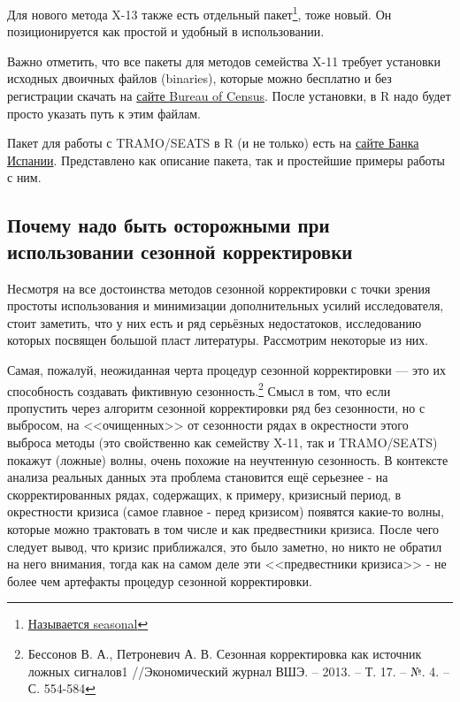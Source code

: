\documentclass[final,pdftex]{../../template/epsilonj}\usepackage[]{graphicx}\usepackage[]{color}
\begin{document}
Для нового метода X-13 также есть отдельный пакет\footnote{\href{http://cran.r-project.org/web/packages/seasonal/seasonal.pdf}{Называется seasonal}}, тоже новый. Он позиционируется как простой и удобный в использовании. 

Важно отметить, что все пакеты для методов семейства X-11 требует установки исходных двоичных файлов (binaries), которые можно бесплатно и без регистрации скачать на \href{http://www.census.gov/srd/www/x12a/}{сайте Bureau of Census}. После установки, в R надо будет просто указать путь к этим файлам. 

Пакет для работы с TRAMO/SEATS в R (и не только) есть на \href{http://www.bde.es/bde/en/secciones/servicios/Profesionales/Programas_estadi/Interfaces.html}{сайте Банка Испании}. Представлено как описание пакета, так и простейшие примеры работы с ним. 

\subsection{Почему надо быть осторожными при использовании сезонной корректировки}

Несмотря на все достоинства методов сезонной корректировки с точки зрения простоты использования и минимизации дополнительных усилий исследователя, стоит заметить, что у них есть и ряд серьёзных недостатоков, исследованию которых посвящен большой пласт литературы. Рассмотрим некоторые из них. 

Самая, пожалуй, неожиданная черта процедур сезонной корректировки --- это их способность создавать фиктивную сезонность.\footnote{Бессонов В. А., Петроневич А. В. Сезонная корректировка как источник ложных сигналов1 //Экономический журнал ВШЭ. – 2013. – Т. 17. – №. 4. – С. 554-584} Смысл в том, что если пропустить через алгоритм сезонной корректировки ряд без сезонности, но с выбросом, на <<очищенных>> от сезонности рядах в окрестности этого выброса методы (это свойственно как семейству X-11, так и TRAMO/SEATS) покажут (ложные) волны, очень похожие на неучтенную сезонность. В контексте анализа реальных данных эта проблема становится ещё серьезнее - на скорректированных рядах, содержащих, к примеру, кризисный период, в окрестности кризиса (самое главное - перед кризисом) появятся какие-то волны, которые можно трактовать в том числе и как предвестники кризиса. После чего следует вывод, что кризис приближался, это было заметно, но никто не обратил на него внимания, тогда как на самом деле эти <<предвестники кризиса>> - не более чем артефакты процедур сезонной корректировки. 
\end{document}
